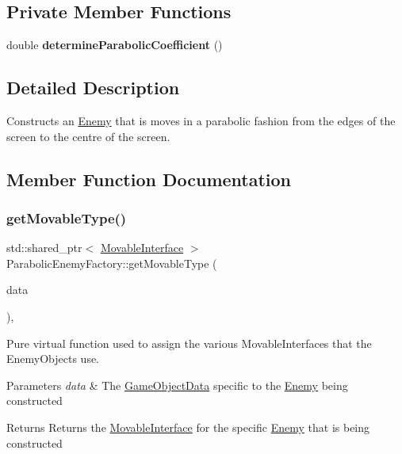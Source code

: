 \subsection*{Private Member Functions}
\begin{DoxyCompactItemize}
\item 
\mbox{\label{class_parabolic_enemy_factory_ad94922df9b01d26e5d7fda695dcc41a5}} 
double {\bfseries determine\+Parabolic\+Coefficient} ()
\end{DoxyCompactItemize}


\subsection{Detailed Description}
Constructs an \hyperlink{class_enemy}{Enemy} that is moves in a parabolic fashion from the edges of the screen to the centre of the screen. 

\subsection{Member Function Documentation}
\mbox{\label{class_parabolic_enemy_factory_aaf1f3323e4c723f669a11c20a7e38efe}} 
\subsubsection{\texorpdfstring{get\+Movable\+Type()}{getMovableType()}}
{\footnotesize\ttfamily std\+::shared\+\_\+ptr$<$ \hyperlink{class_movable_interface}{Movable\+Interface} $>$ Parabolic\+Enemy\+Factory\+::get\+Movable\+Type (\begin{DoxyParamCaption}\item[{const \hyperlink{struct_game_object_data}{Game\+Object\+Data} \&}]{data }\end{DoxyParamCaption})\hspace{0.3cm}{\ttfamily [override]}, {\ttfamily [virtual]}}



Pure virtual function used to assign the various Movable\+Interfaces that the Enemy\+Objects use. 


\begin{DoxyParams}{Parameters}
{\em data} & The \hyperlink{struct_game_object_data}{Game\+Object\+Data} specific to the \hyperlink{class_enemy}{Enemy} being constructed \\
\hline
\end{DoxyParams}
\begin{DoxyReturn}{Returns}
Returns the \hyperlink{class_movable_interface}{Movable\+Interface} for the specific \hyperlink{class_enemy}{Enemy} that is being constructed 
\end{DoxyReturn}


